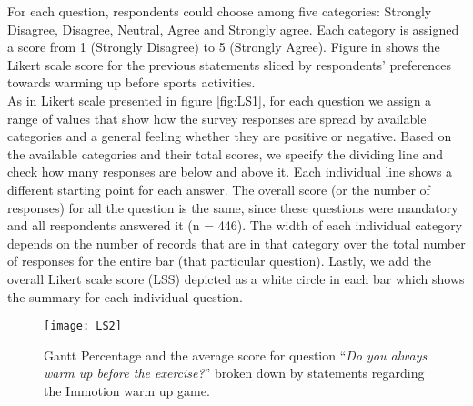 For each question, respondents could choose among five categories: Strongly Disagree, Disagree, Neutral, Agree and Strongly agree. Each category is assigned a score from 1 (Strongly Disagree) to 5 (Strongly Agree). Figure in  shows the Likert scale score for the previous statements sliced by respondents' preferences towards warming up before sports activities.\\
As in Likert scale presented in figure \ref{fig:LS1}, for each question we assign a range of values that show how the survey responses are spread by available categories and a general feeling whether they are positive or negative. Based on the available categories and their total scores, we specify the dividing line and check how many responses are below and above it. Each individual line shows a different starting point for each answer. The overall score (or the number of responses) for all the question is the same, since these questions were mandatory and all respondents answered it (n = 446). The width of each individual category depends on the number of records that are in that category over the total number of responses for the entire bar (that particular question). Lastly, we add the overall Likert scale score (LSS) depicted as a white circle in each bar which shows the summary for each individual question.  
\begin{figure}[h]
    \centering
    \texttt{[image: LS2]}
    \caption{Gantt Percentage and the average score for question ``\textit{Do you always warm up before the exercise?}'' broken down by statements regarding the Immotion warm up game.}
    \label{fig:LS2}
\end{figure}\\ 
